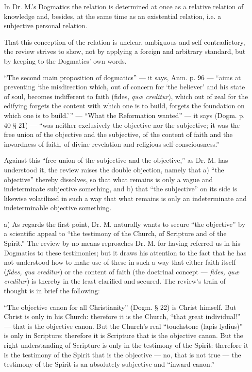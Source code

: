\documentclass[12pt,a4paper,openany]{book}
\newcommand{\opage}[1]{\marginnote{\footnotesize\textit{[#1]}}}
\begin{document}
In Dr. M.'s Dogmatics the relation is determined at
once as a relative relation of knowledge and, besides, at the same time as
an existential relation, i.e. a subjective personal relation.

That this conception of the relation is unclear, ambiguous and
self-contradictory, the review strives to show, not by applying
a foreign and arbitrary standard, but by keeping %
to the Dogmatics' own words.

``The second main proposition of dogmatics'' --- it says, Anm.
p. 96 --- ``aims at preventing `the misdirection which,
out of concern for `the believer' and his state of soul, becomes
\setcounter{footnote}{0}%
\opage{59}indifferent to faith (fides, \textit{quæ creditur}), which out of zeal for
the edifying forgets the content with which one is to build,
forgets the foundation on which one is to build.'\,'' --- ``What
the Reformation wanted'' --- it says (Dogm. p. 40 § 21) ---
``was neither exclusively the objective nor the subjective;
it was the free union of the objective and the subjective,
of the content of faith and the inwardness of faith, of divine
revelation and religious self-consciousness.''

Against this ``free union of the subjective and the objective,''
as Dr. M. has understood it, the review raises
the double objection, namely that a) ``the objective'' thereby
dissolves, so that what remains is only a vague and
indeterminate subjective something, and b) that ``the subjective'' on its
side is likewise volatilized in such a way that what remains
is only an indeterminate and indeterminable objective something.

a) As regards the first point, Dr. M. naturally wants
to secure ``the objective'' by a scientific appeal
to ``the testimony of the Church, of Scripture and of the Spirit.''
The review by no means reproaches Dr. M. for having
referred us in his Dogmatics to these testimonies; but
it draws his attention to the fact that he has not understood how to
make use of these in such a way that either faith itself (\textit{fides, qua creditur}) or the content of faith (the doctrinal concept --- \textit{fides, quæ}
\textit{creditur}) is thereby in the least clarified and secured. The review's
train of thought is in brief the following:

``The objective canon for all Christianity'' (Dogm. §
22) is Christ himself. But Christ is only in his Church:
therefore it is the Church, ``that great individual!'' --- that is the
objective canon. But the Church's real ``touchstone (lapis
lydius)'' is only in Scripture: therefore it is Scripture that is
\setcounter{footnote}{0}%
\opage{60}the objective canon. But the right understanding of Scripture is
only in the testimony of the Spirit: therefore it is the testimony of the Spirit
that is the objective --- no, that is not true ---
the testimony of the Spirit is an absolutely subjective and ``inward
canon.''
\end{document}
